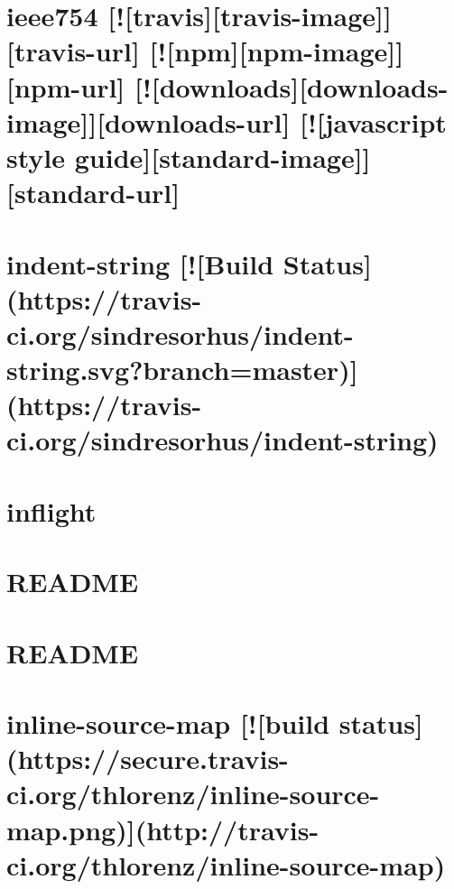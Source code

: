 \documentclass[twoside]{book}
\newcommand{\+}{\discretionary{\mbox{\scriptsize$\hookleftarrow$}}{}{}}
\begin{document}
\chapter{ieee754 \mbox{[}!\mbox{[}travis\mbox{]}\mbox{[}travis-\/image\mbox{]}\mbox{]}\mbox{[}travis-\/url\mbox{]} \mbox{[}!\mbox{[}npm\mbox{]}\mbox{[}npm-\/image\mbox{]}\mbox{]}\mbox{[}npm-\/url\mbox{]} \mbox{[}!\mbox{[}downloads\mbox{]}\mbox{[}downloads-\/image\mbox{]}\mbox{]}\mbox{[}downloads-\/url\mbox{]} \mbox{[}!\mbox{[}javascript style guide\mbox{]}\mbox{[}standard-\/image\mbox{]}\mbox{]}\mbox{[}standard-\/url\mbox{]}}
\label{md_dsmacc_examples_DRmerge_node_modules_ieee754_README}

\chapter{indent-\/string \mbox{[}!\mbox{[}Build Status\mbox{]}(https\+://travis-\/ci.org/sindresorhus/indent-\/string.svg?branch=master)\mbox{]}(https\+://travis-\/ci.org/sindresorhus/indent-\/string)}
\label{md_dsmacc_examples_DRmerge_node_modules_indent-string_readme}

\chapter{inflight}
\label{md_dsmacc_examples_DRmerge_node_modules_inflight_README}

\chapter{R\+E\+A\+D\+ME}
\label{md_dsmacc_examples_DRmerge_node_modules_inherits_README}

\chapter{R\+E\+A\+D\+ME}
\label{md_dsmacc_examples_DRmerge_node_modules_ini_README}

\chapter{inline-\/source-\/map \mbox{[}!\mbox{[}build status\mbox{]}(https\+://secure.travis-\/ci.org/thlorenz/inline-\/source-\/map.png)\mbox{]}(http\+://travis-\/ci.org/thlorenz/inline-\/source-\/map)}
\label{md_dsmacc_examples_DRmerge_node_modules_inline-source-map_README}

\end{document}
